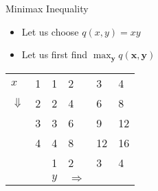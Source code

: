 \documentclass[xcolor=table]{beamer}
\begin{document}
\begin{frame}{Minimax Inequality}
    \begin{itemize}[<+->]
    \item Let us choose $q(x, y) = xy$
    \item Let us first find $\max _{\boldsymbol{y}} q(\boldsymbol{x}, \boldsymbol{y})$

    \end{itemize}
    
    \pause \begin{table}[]
        \begin{tabular}{llllll}
        \cline{2-2}
        \multicolumn{1}{l|}{$x$}          & \multicolumn{1}{l|}{1} & 1                      & 2                      & 3                      & 4                      \\ \cline{2-2}
        \multicolumn{1}{l|}{$\Downarrow$} & \multicolumn{1}{l|}{2} & 2                      & 4                      & 6                      & 8                      \\ \cline{2-2}
        \multicolumn{1}{l|}{}             & \multicolumn{1}{l|}{3} & 3                      & 6                      & 9                      & 12                     \\ \cline{2-2}
        \multicolumn{1}{l|}{}             & \multicolumn{1}{l|}{4} & 4                      & 8                      & 12                     & 16                     \\ \cline{2-6} 
        \multicolumn{1}{l|}{}             & \multicolumn{1}{l|}{}  & \multicolumn{1}{l|}{1} & \multicolumn{1}{l|}{2} & \multicolumn{1}{l|}{3} & \multicolumn{1}{l|}{4} \\ \cline{2-6} 
                                          &                        & $y$              & $\Rightarrow$           &                        &                       
        \end{tabular}
        \end{table}



    \end{frame}
\end{document}
